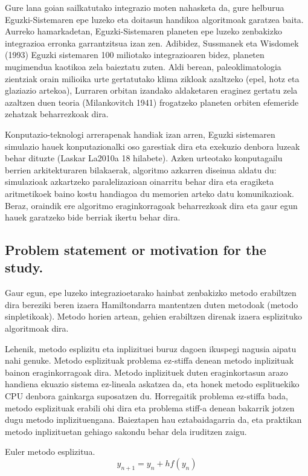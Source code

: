 Gure lana goian sailkatutako integrazio moten nahasketa da, gure helburua Eguzki-Sistemaren epe luzeko eta doitasun handikoa algoritmoak garatzea baita. Aurreko hamarkadetan, Eguzki-Sistemaren planeten epe luzeko zenbakizko integrazioa erronka garrantzitsua izan zen. Adibidez, Sussmanek eta Wisdomek (1993) Eguzki sistemaren 100 miliotako integrazioaren bidez, planeten mugimendua kaotikoa zela baieztatu zuten. Aldi berean, paleoklimatologia zientziak orain milioika urte gertatutako klima zikloak  azaltzeko (epel, hotz eta glaziazio artekoa), Lurraren orbitan izandako aldaketaren eraginez gertatu zela azaltzen duen teoria (Milankovitch 1941) frogatzeko planeten orbiten efemeride zehatzak beharrezkoak dira.        

Konputazio-teknologi arrerapenak handiak izan arren, Eguzki sistemaren simulazio hauek konputazionalki oso garestiak dira eta exekuzio denbora luzeak behar dituzte (Laskar La2010a 18 hilabete). Azken urteotako konputagailu berrien arkitekturaren bilakaerak, algoritmo azkarren diseinua aldatu du: simulazioak azkartzeko paralelizazioan oinarritu behar dira eta eragiketa aritmetikoek baino kostu handiagoa du memorien arteko datu komunikazioak. Beraz, oraindik ere algoritmo eraginkorragoak beharrezkoak dira eta gaur egun hauek garatzeko bide berriak ikertu behar dira.


\subsection{Problem statement or motivation for the study.}
\label{intro}

Gaur egun, epe luzeko integrazioetarako hainbat zenbakizko metodo erabiltzen dira bereziki beren izaera Hamiltondarra mantentzen duten metodoak (metodo sinpletikoak). Metodo horien artean, gehien erabiltzen direnak izaera esplizituko algoritmoak dira.

Lehenik, metodo esplizitu eta inplizituei buruz dagoen ikuspegi nagusia aipatu nahi genuke. Metodo esplizituak problema ez-stiffa denean metodo inplizituak bainon eraginkorragoak dira. Metodo inplizituek duten eraginkortasun arazo handiena ekuazio sistema ez-lineala askatzea da, eta honek metodo esplituekiko CPU denbora gainkarga suposatzen du. Horregaitik problema ez-stiffa bada, metodo esplizituak erabili ohi dira eta problema stiff-a denean bakarrik jotzen dugu metodo inplizituengana. Baieztapen hau eztabaidagarria da, eta praktikan metodo inplizituetan gehiago sakondu behar dela iruditzen zaigu. 

Euler metodo esplizitua.					  
\begin{equation}
y_{n+1}=y_n+hf(y_n)
\end{equation}

